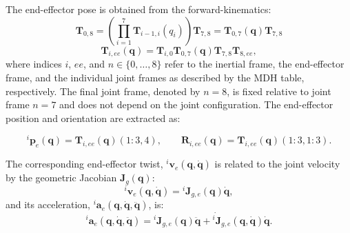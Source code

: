 The end-effector pose is obtained from the forward-kinematics:
\begin{equation}
    \mathbf{T}_{0,8} = 
    \left( \prod_{i=1}^{7} \mathbf{T}_{i-1,i}(q_i) \right) \mathbf{T}_{7,8} =
    \mathbf{T}_{0,7}(\mathbf{q})\mathbf{T}_{7,8}
    \label{eq:DH_frame_chain}
\end{equation}
\begin{equation}
    \mathbf{T}_{i,ee}(\mathbf{q}) = 
    \mathbf{T}_{i,0} \mathbf{T}_{0,7}(\mathbf{q})\mathbf{T}_{7,8} \mathbf{T}_{8,ee},
    \label{eq:robot_forward_kinematics}
\end{equation}
where indices $i$, $ee$, and $n \in \{0,\dots,8\}$ refer to the inertial frame, the end-effector frame, and the individual joint frames as described by the \ac{MDH} table, respectively. 
The final joint frame, denoted by $n=8$, is fixed relative to joint frame $n=7$ and does not depend on the joint configuration.
The end-effector position and orientation are extracted as:

\begin{equation}
    {}^i\mathbf{p}_{e}(\mathbf{q}) = \mathbf{T}_{i,ee}(\mathbf{q})(1\!:\!3,4), \qquad \mathbf{R}_{i,ee}(\mathbf{q}) = \mathbf{T}_{i,ee}(\mathbf{q})(1\!:\!3,1\!:\!3).
    \label{eq:robot_ee_extraction}
\end{equation}

The corresponding end-effector twist, ${}^i\mathbf{v}_{e}(\mathbf{q},\dot{\mathbf{q}})$ is related to the joint velocity by the geometric Jacobian $\mathbf{J}_{g}(\mathbf{q})$:
\begin{equation}
    {}^i\mathbf{v}_{e}(\mathbf{q},\dot{\mathbf{q}}) = 
    {}^i\mathbf{J}_{g,e}(\mathbf{q})\dot{\mathbf{q}},
    \label{eq:robot_end_effector_velocity}
\end{equation}
and its acceleration, ${}^i{\mathbf{a}}_{e}(\mathbf{q},\dot{\mathbf{q}},\ddot{\mathbf{q}})$, is:
\begin{equation}
    {}^i{\mathbf{a}}_{e}(\mathbf{q},\dot{\mathbf{q}},\ddot{\mathbf{q}}) = {}^i\mathbf{J}_{g,e}(\mathbf{q})\ddot{\mathbf{q}} + \dot{{}^i\mathbf{J}}_{g,e}(\mathbf{q},\dot{\mathbf{q}}) \dot{\mathbf{q}}.
    \label{eq:robot_end_effector_acceleration}
\end{equation}

